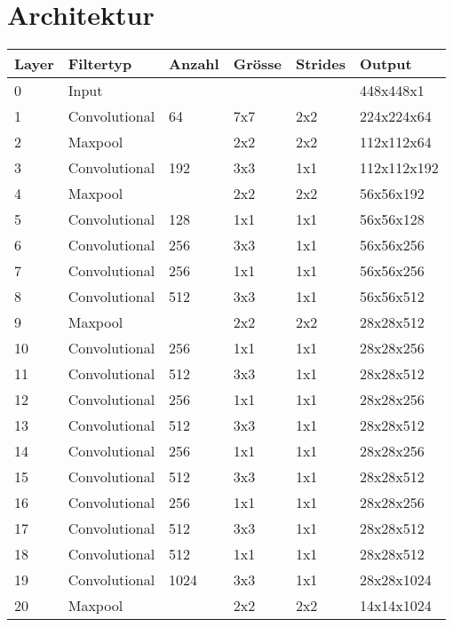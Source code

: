 \newpage
\section{Architektur} 

\begin{table}
\centering
\begin{tabularx}{1.1\textwidth}{|l|l|l|l|l|X|}
\hline
\textbf{Layer} & \textbf{Filtertyp}  & \textbf{Anzahl} & \textbf{Grösse} & \textbf{Strides} & \textbf{Output} \\
\hline 	0	& Input				&		&		&		& 448x448x1\\
\hline 	1	& Convolutional		& 64		& 7x7	& 2x2	& 224x224x64	\\
\hline 	2	& Maxpool      		& 		& 2x2	& 2x2	& 112x112x64	\\
\hline 	3   & Convolutional		& 192	& 3x3	& 1x1	& 112x112x192\\
\hline 	4	& Maxpool			& 		& 2x2	& 2x2	& 56x56x192	\\
\hline 	5	& Convolutional		& 128	& 1x1	& 1x1	& 56x56x128	\\
\hline 	6	& Convolutional		& 256	& 3x3	& 1x1	& 56x56x256	\\
\hline 	7	& Convolutional		& 256	& 1x1	& 1x1	& 56x56x256	\\
\hline 	8	& Convolutional		& 512	& 3x3	& 1x1	& 56x56x512	\\
\hline 	9	& Maxpool			&		& 2x2	& 2x2	& 28x28x512	\\
\hline 	10	& Convolutional		& 256	& 1x1	& 1x1	& 28x28x256	\\
\hline 	11	& Convolutional		& 512	& 3x3	& 1x1	& 28x28x512	\\
\hline 	12	& Convolutional		& 256	& 1x1	& 1x1	& 28x28x256	\\
\hline 	13	& Convolutional		& 512	& 3x3	& 1x1	& 28x28x512	\\
\hline 	14	& Convolutional		& 256	& 1x1	& 1x1	& 28x28x256	\\
\hline 	15	& Convolutional		& 512	& 3x3	& 1x1	& 28x28x512	\\
\hline  	16	& Convolutional		& 256	& 1x1	& 1x1	& 28x28x256	\\
\hline  	17	& Convolutional		& 512	& 3x3	& 1x1	& 28x28x512	\\
\hline 	18	& Convolutional		& 512	& 1x1	& 1x1	& 28x28x512	\\
\hline  	19	& Convolutional		& 1024	& 3x3	& 1x1	& 28x28x1024	\\
\hline  	20	& Maxpool			&		& 2x2	& 2x2	& 14x14x1024	\\

\end{tabularx}
\end{table}
